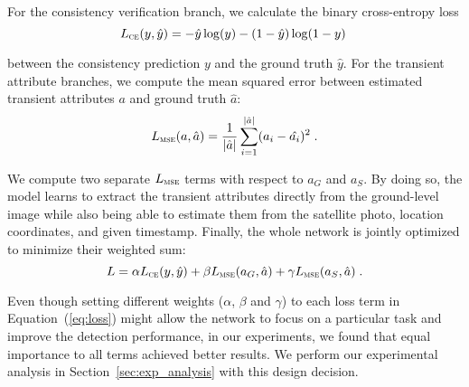 \documentclass[journal]{IEEEtran}
\begin{document}
        For the consistency verification branch, we calculate the binary cross-entropy loss
\begin{equation}
            L_{\textsc{ce}}(y, \hat{y}) = -\hat{y}\log(y) - (1-\hat{y})\log(1-y)\; \end{equation}
        
        \noindent between the consistency prediction $y$ and the ground truth $\hat{y}$. For the transient attribute branches, we compute the mean squared error between estimated transient attributes $a$ and ground truth $\hat{a}$:
\begin{equation}\label{eq:mse}
            L_{\textsc{mse}}(a, \hat{a}) = \frac{1}{|\hat{a}|}\sum_{i=1}^{|\hat{a}|}(a_i - \hat{a_{i}})^2  \;.
        \end{equation}
        
        \noindent We compute two separate $L_{\textsc{mse}}$ terms with respect to $a_{G}$ and $a_{S}$. By doing so, the model learns to extract the transient attributes directly from the ground-level image while also being able to estimate them from the satellite photo, location coordinates, and given timestamp. Finally, the whole network is jointly optimized to minimize their weighted sum:
\begin{equation}\label{eq:loss}
            L = \alpha L_{\textsc{ce}}(y, \hat{y}) + \beta L_{\textsc{mse}}(a_{G}, \hat{a}) + \gamma L_{\textsc{mse}}(a_{S}, \hat{a}) \;.
        \end{equation}


        \noindent Even though setting different weights ($\alpha$, $\beta$ and $\gamma$) to each loss term in Equation~(\ref{eq:loss}) might allow the network to focus on a particular task and improve the detection performance, in our experiments, we found that equal importance to all terms achieved better results. We perform our experimental analysis in Section~\ref{sec:exp_analysis} with this design decision.
\end{document}
